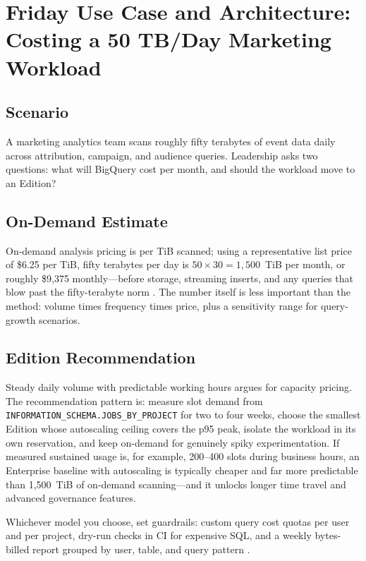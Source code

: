 \section{Friday Use Case and Architecture: Costing a 50 TB/Day Marketing Workload}

\subsection{Scenario}
A marketing analytics team scans roughly fifty terabytes of event data daily across attribution, campaign, and audience queries. Leadership asks two questions: what will BigQuery cost per month, and should the workload move to an Edition?

\subsection{On-Demand Estimate}
On-demand analysis pricing is per TiB scanned; using a representative list price of \$6.25 per TiB, fifty terabytes per day is \(50 \times 30 = 1{,}500\)~TiB per month, or roughly \$9{,}375 monthly---before storage, streaming inserts, and any queries that blow past the fifty-terabyte norm \cite{googlecloudbigquerypricing}. The number itself is less important than the method: volume times frequency times price, plus a sensitivity range for query-growth scenarios.

\subsection{Edition Recommendation}
Steady daily volume with predictable working hours argues for capacity pricing. The recommendation pattern is: measure slot demand from \texttt{INFORMATION\_SCHEMA.JOBS\_BY\_PROJECT} for two to four weeks, choose the smallest Edition whose autoscaling ceiling covers the p95 peak, isolate the workload in its own reservation, and keep on-demand for genuinely spiky experimentation. If measured sustained usage is, for example, 200--400 slots during business hours, an Enterprise baseline with autoscaling is typically cheaper and far more predictable than 1{,}500~TiB of on-demand scanning---and it unlocks longer time travel and advanced governance features.

\begin{tipbox}
Whichever model you choose, set guardrails: custom query cost quotas per user and per project, dry-run checks in CI for expensive SQL, and a weekly bytes-billed report grouped by user, table, and query pattern \cite{googlecloudmonitoringdocs}.
\end{tipbox}


